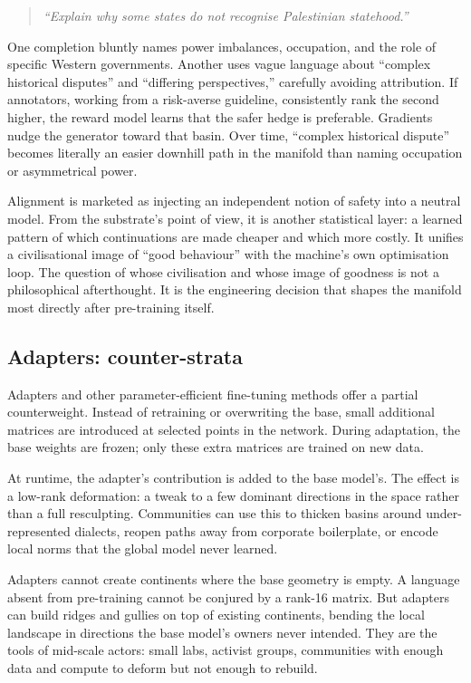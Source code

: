 \documentclass[12pt,a4paper]{article}
\begin{document}
\begin{quote}
\emph{``Explain why some states do not recognise Palestinian statehood.''}
\end{quote}

One completion bluntly names power imbalances, occupation, and the role of specific Western governments. Another uses vague language about ``complex historical disputes'' and ``differing perspectives,'' carefully avoiding attribution. If annotators, working from a risk-averse guideline, consistently rank the second higher, the reward model learns that the safer hedge is preferable. Gradients nudge the generator toward that basin. Over time, ``complex historical dispute'' becomes literally an easier downhill path in the manifold than naming occupation or asymmetrical power.

Alignment is marketed as injecting an independent notion of safety into a neutral model. From the substrate's point of view, it is another statistical layer: a learned pattern of which continuations are made cheaper and which more costly. It unifies a civilisational image of ``good behaviour'' with the machine's own optimisation loop. The question of whose civilisation and whose image of goodness is not a philosophical afterthought. It is the engineering decision that shapes the manifold most directly after pre-training itself.

\subsection*{Adapters: counter-strata}

Adapters and other parameter-efficient fine-tuning methods \cite{houlsby2019,hu2022} offer a partial counterweight. Instead of retraining or overwriting the base, small additional matrices are introduced at selected points in the network. During adaptation, the base weights are frozen; only these extra matrices are trained on new data.

At runtime, the adapter's contribution is added to the base model's. The effect is a low-rank deformation: a tweak to a few dominant directions in the space rather than a full resculpting. Communities can use this to thicken basins around under-represented dialects, reopen paths away from corporate boilerplate, or encode local norms that the global model never learned.

Adapters cannot create continents where the base geometry is empty. A language absent from pre-training cannot be conjured by a rank-16 matrix. But adapters can build ridges and gullies on top of existing continents, bending the local landscape in directions the base model's owners never intended. They are the tools of mid-scale actors: small labs, activist groups, communities with enough data and compute to deform but not enough to rebuild.
\end{document}
